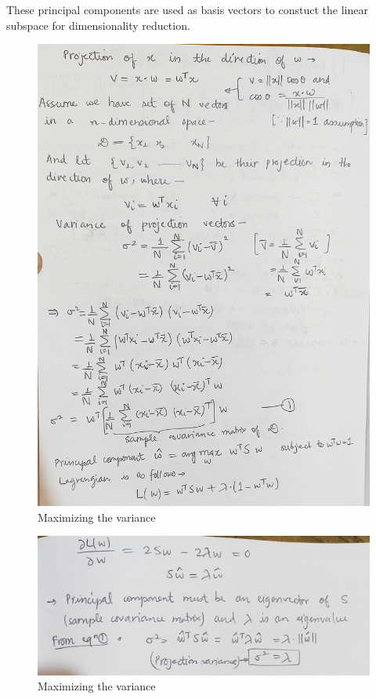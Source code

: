 \documentclass[12pt,reqno]{amsart}
\theoremstyle{plain}
\theoremstyle{definition}
\begin{document}
\par These principal components are used as basis vectors to constuct the linear subspace for dimensionality reduction.
\begin{figure}[!ht]
    \centerline{\includegraphics[scale=.17]{assests/1000124291.jpg}}
    \caption{Maximizing the variance}
    \label{fig1}
\end{figure}
\begin{figure}[!ht]
    \centerline{\includegraphics[scale=.17]{assests/1000124289.jpg}}
    \caption{Maximizing the variance}
    \label{fig2}
\end{figure}
\end{document}
